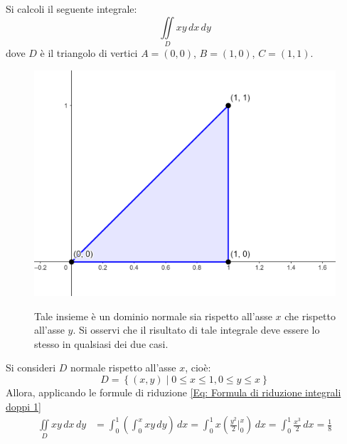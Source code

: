 \begin{example}
    Si calcoli il seguente integrale:
    \begin{equation*}
        \iint\limits_{D}{xy}\,dx\,dy
    \end{equation*}
    dove $D$ è il triangolo di vertici $A=(0,0)$, $B=(1,0)$, $C=(1,1)$.
    \begin{figure}[H]
   \begin{minipage}{0.3\textwidth}
   \centering
   \includegraphics[width=\textwidth]{Capitoli/Capitolo4/Integrale 1.png}
    \end{minipage}
    \hfill
    \begin{minipage}{0.55\textwidth} 
    Tale insieme è un dominio normale sia rispetto all'asse $x$ che rispetto all'asse $y$. Si osservi che il risultato di tale integrale deve essere lo stesso in qualsiasi dei due casi.
    \end{minipage}
    \end{figure}
    Si consideri $D$ normale rispetto all'asse $x$, cioè:
    \begin{equation*}
        D= \left\{(x,y) \mid 0 \leq x \leq 1, 0 \leq y \leq x \right\}
    \end{equation*}
    Allora, applicando le formule di riduzione \eqref{Eq: Formula di riduzione integrali doppi 1}
    \begin{equation*}
    \begin{aligned}
        \iint\limits_D{xy}\,dx\,dy &= \int_{0}^{1}{\left(\int_{0}^{x}xy\,dy\right)}\,dx=  \int_{0}^{1}{x\left(\frac{y^2}{2}\Big|_{0}^{x}\right)\,dx = \int_{0}^{1}\frac{x^3}{2}\,dx} = \frac{1}{8}
    \end{aligned}

\end{equation*}
\end{example}

